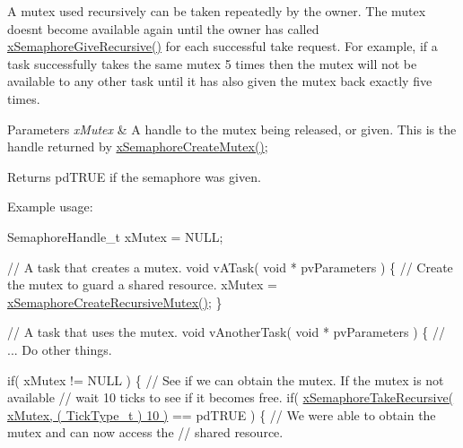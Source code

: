 A mutex used recursively can be \textquotesingle{}taken\textquotesingle{} repeatedly by the owner. The mutex doesn\textquotesingle{}t become available again until the owner has called \hyperlink{vendor_2ceedling_2plugins_2freertos_2src_2freertos_2include_2semphr_8h_a398d66b17856c22dd49d39aaac42f105}{x\+Semaphore\+Give\+Recursive()} for each successful \textquotesingle{}take\textquotesingle{} request. For example, if a task successfully \textquotesingle{}takes\textquotesingle{} the same mutex 5 times then the mutex will not be available to any other task until it has also \textquotesingle{}given\textquotesingle{} the mutex back exactly five times.


\begin{DoxyParams}{Parameters}
{\em x\+Mutex} & A handle to the mutex being released, or \textquotesingle{}given\textquotesingle{}. This is the handle returned by \hyperlink{vendor_2ceedling_2plugins_2freertos_2src_2freertos_2include_2semphr_8h_aa6a00aa9b91a9e5b3ebe4ae1c3f115c6}{x\+Semaphore\+Create\+Mutex()};\\
\hline
\end{DoxyParams}
\begin{DoxyReturn}{Returns}
pd\+T\+R\+UE if the semaphore was given.
\end{DoxyReturn}
Example usage\+: 
\begin{DoxyPre}
SemaphoreHandle\_t xMutex = NULL;\end{DoxyPre}



\begin{DoxyPre}// A task that creates a mutex.
void vATask( void * pvParameters )
\{
   // Create the mutex to guard a shared resource.
   xMutex = \hyperlink{vendor_2ceedling_2plugins_2freertos_2src_2freertos_2include_2semphr_8h_a1bbc843be5a41ea83d2693b2189fc0f8}{xSemaphoreCreateRecursiveMutex()};
\}\end{DoxyPre}



\begin{DoxyPre}// A task that uses the mutex.
void vAnotherTask( void * pvParameters )
\{
   // ... Do other things.\end{DoxyPre}



\begin{DoxyPre}   if( xMutex != NULL )
   \{
       // See if we can obtain the mutex.  If the mutex is not available
       // wait 10 ticks to see if it becomes free.
       if( \hyperlink{vendor_2ceedling_2plugins_2freertos_2src_2freertos_2include_2semphr_8h_ad395f4bba51eea6af3397d72bc079e4d}{xSemaphoreTakeRecursive( xMutex, ( TickType\_t ) 10 )} == pdTRUE )
       \{
           // We were able to obtain the mutex and can now access the
           // shared resource.\end{DoxyPre}




